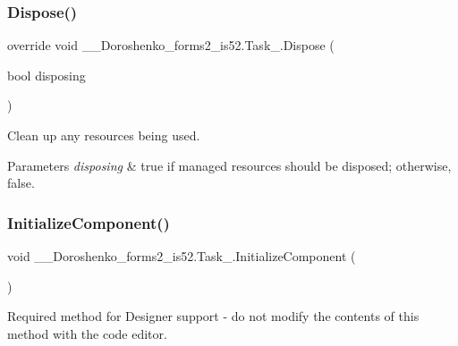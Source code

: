 \subsubsection{\texorpdfstring{Dispose()}{Dispose()}}
{\footnotesize\ttfamily override void \+\_\+\_\+\+Doroshenko\+\_\+forms2\+\_\+is52.\+Task\+\_.\+Dispose (\begin{DoxyParamCaption}\item[{bool}]{disposing }\end{DoxyParamCaption})\hspace{0.3cm}{\ttfamily [protected]}}



Clean up any resources being used. 


\begin{DoxyParams}{Parameters}
{\em disposing} & true if managed resources should be disposed; otherwise, false.\\
\hline
\end{DoxyParams}
\hypertarget{class__7___doroshenko__forms2__is52_1_1_task__3_aa9d7c9bafe9f8493f86e81275d91f706}{}\label{class__7___doroshenko__forms2__is52_1_1_task__3_aa9d7c9bafe9f8493f86e81275d91f706} 
\subsubsection{\texorpdfstring{Initialize\+Component()}{InitializeComponent()}}
{\footnotesize\ttfamily void \+\_\+\_\+\+Doroshenko\+\_\+forms2\+\_\+is52.\+Task\+\_.\+Initialize\+Component (\begin{DoxyParamCaption}{ }\end{DoxyParamCaption})\hspace{0.3cm}{\ttfamily [private]}}



Required method for Designer support -\/ do not modify the contents of this method with the code editor. 

